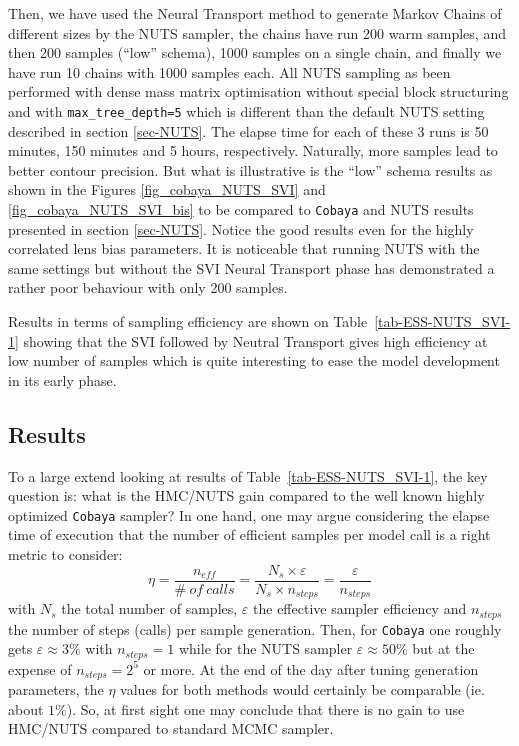 \documentclass[twocolumn,twocolappendix,nofootinbib,iop]{openjournal}
\begin{document}
Then, we have used the Neural Transport method to generate Markov Chains of different sizes by the NUTS sampler, the chains have run 200 warm samples, and then 200 samples (``low'' schema), 1000 samples on a single chain, and finally we have run 10 chains  with 1000 samples each. All NUTS sampling as been performed with dense mass matrix optimisation without special block structuring and with \texttt{max\_tree\_depth=5} which is different than the default NUTS setting described in section \ref{sec-NUTS}. The elapse time for each of these 3 runs is 50 minutes, 150 minutes and 5 hours, respectively. Naturally, more samples lead to better contour precision. But what is illustrative is the ``low'' schema results as shown in the Figures \ref{fig_cobaya_NUTS_SVI} and \ref{fig_cobaya_NUTS_SVI_bis}  to be compared to \texttt{Cobaya} and NUTS results presented in section \ref{sec-NUTS}. Notice the good results even for the highly correlated lens bias parameters. It is noticeable that running NUTS with the same settings  but without the SVI Neural Transport phase has demonstrated a rather poor behaviour with only 200 samples.  

Results in terms of sampling efficiency are shown on Table~\ref{tab-ESS-NUTS_SVI-1} showing that the SVI followed by Neutral Transport gives high efficiency at low number of samples which is quite interesting to ease the model development in its early phase.
%
\subsection{Results}
\label{sec-results}
%
To a large extend looking at results of Table~\ref{tab-ESS-NUTS_SVI-1}, the key question is: what is the HMC/NUTS gain compared to the well known highly optimized \texttt{Cobaya} sampler? 
In one hand, one may argue considering the elapse time of execution that the number of efficient samples per model call is a right metric to consider: 
\begin{equation}
    \eta = \frac{n_{eff}}{\#\ of\ calls} = \frac{N_s \times \varepsilon}{N_s \times n_{steps}} = \frac{\varepsilon}{n_{steps}}
\end{equation}
with $N_s$ the total number of samples, $\varepsilon$ the effective sampler efficiency  and $n_{steps}$ the number of steps (calls) per sample generation. Then, for \texttt{Cobaya} one roughly gets $\varepsilon\approx 3\%$ with $n_{steps}=1$ while for the NUTS sampler $\varepsilon\approx 50\%$ but at the expense of $n_{steps}=2^5$ or more. At the end of the day after tuning generation parameters, the $\eta$ values for both methods would certainly be comparable (ie. about $1\%$). So, at first sight one may conclude that there is no gain to use HMC/NUTS compared to standard MCMC sampler.  
\end{document}
